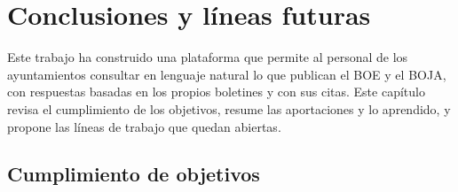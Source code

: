 \chapter{Conclusiones y líneas futuras}
\label{cap:conclusiones}

Este trabajo ha construido una plataforma que permite al personal de los ayuntamientos consultar en lenguaje natural lo que publican el BOE y el BOJA, con respuestas basadas en los propios boletines y con sus citas. Este capítulo revisa el cumplimiento de los objetivos, resume las aportaciones y lo aprendido, y propone las líneas de trabajo que quedan abiertas.

\section{Cumplimiento de objetivos}
\label{sec:cumplimiento}

